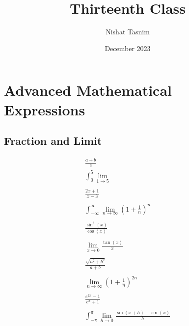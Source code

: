 \documentclass{article}
\title{Thirteenth Class}
\author{Nishat Tasnim}
\date{December 2023}
\begin{document}
\section{Advanced Mathematical Expressions}

\subsection{Fraction and Limit}
\begin{align*}
    \frac{a+b}{c}\\
    \int_{0}^{5}\displaystyle \lim_{{1 \to 5}}\\\\
    \frac{2x+1}{x-3}\\\\
    \int_{-\infty}^{\infty}\displaystyle \lim_{{n \to \infty}}\left(1 + \frac{1}{n}\right)^n\\\\
    \frac{\sin^2(x)}{\cos(x)}\\\\
    \lim_{{x \to 0}}\frac{\tan(x)}{x}\\\\
    \frac{\sqrt{a^2 + b^2}}{a+b}\\\\
    \lim_{{n \to \infty}}\left(1 + \frac{1}{n}\right)^{2n}\\\\
    \frac{e^{2x} - 1}{e^x + 1}\\\\
    \int_{-\pi}^{\pi}\displaystyle \lim_{{h \to 0}}\frac{\sin(x+h) - \sin(x)}{h}
\end{align*}
\end{document}
